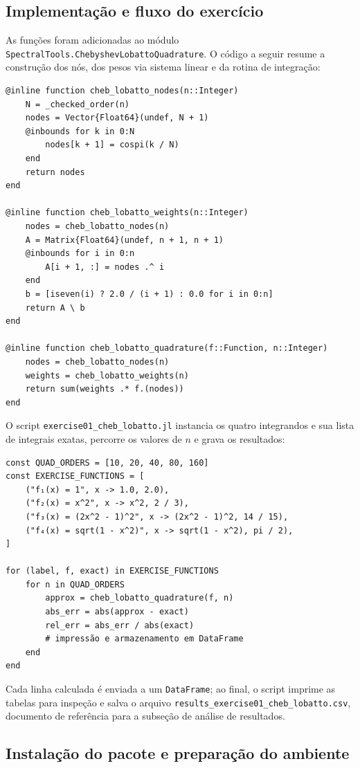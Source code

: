 \subsection{Implementação e fluxo do exercício}

As funções foram adicionadas ao módulo
\texttt{SpectralTools.ChebyshevLobattoQuadrature}. O código a seguir resume a
construção dos nós, dos pesos via sistema linear e da rotina de integração:

\begin{verbatim}
@inline function cheb_lobatto_nodes(n::Integer)
    N = _checked_order(n)
    nodes = Vector{Float64}(undef, N + 1)
    @inbounds for k in 0:N
        nodes[k + 1] = cospi(k / N)
    end
    return nodes
end

@inline function cheb_lobatto_weights(n::Integer)
    nodes = cheb_lobatto_nodes(n)
    A = Matrix{Float64}(undef, n + 1, n + 1)
    @inbounds for i in 0:n
        A[i + 1, :] = nodes .^ i
    end
    b = [iseven(i) ? 2.0 / (i + 1) : 0.0 for i in 0:n]
    return A \ b
end

@inline function cheb_lobatto_quadrature(f::Function, n::Integer)
    nodes = cheb_lobatto_nodes(n)
    weights = cheb_lobatto_weights(n)
    return sum(weights .* f.(nodes))
end
\end{verbatim}

O script \texttt{exercise01\_cheb\_lobatto.jl} instancia os quatro integrandos e
sua lista de integrais exatas, percorre os valores de $n$ e grava os resultados:

\begin{verbatim}
const QUAD_ORDERS = [10, 20, 40, 80, 160]
const EXERCISE_FUNCTIONS = [
    ("f₁(x) = 1", x -> 1.0, 2.0),
    ("f₂(x) = x^2", x -> x^2, 2 / 3),
    ("f₃(x) = (2x^2 - 1)^2", x -> (2x^2 - 1)^2, 14 / 15),
    ("f₄(x) = sqrt(1 - x^2)", x -> sqrt(1 - x^2), pi / 2),
]

for (label, f, exact) in EXERCISE_FUNCTIONS
    for n in QUAD_ORDERS
        approx = cheb_lobatto_quadrature(f, n)
        abs_err = abs(approx - exact)
        rel_err = abs_err / abs(exact)
        # impressão e armazenamento em DataFrame
    end
end
\end{verbatim}

Cada linha calculada é enviada a um \texttt{DataFrame}; ao final, o script imprime
as tabelas para inspeção e salva o arquivo
\texttt{results\_exercise01\_cheb\_lobatto.csv}, documento de referência para a
subseção de análise de resultados.

\subsection{Instalação do pacote e preparação do ambiente}

